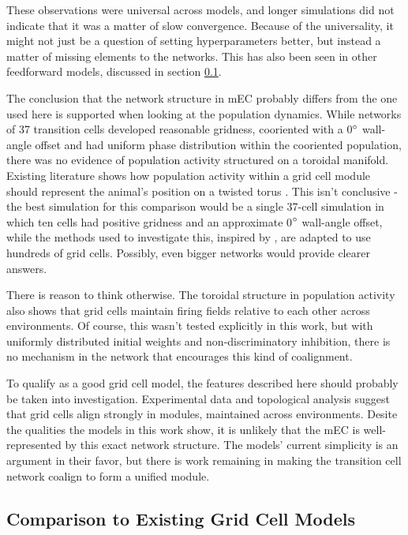 \documentclass{article}
\begin{document}
    These observations were universal across models, and longer simulations did not indicate that it was a matter of slow convergence. Because of the universality, it might not just be a question of setting hyperparameters better, but instead a matter of missing elements to the networks. This has also been seen in other feedforward models, discussed in section \ref{Other model comparisons}.

    The conclusion that the network structure in mEC probably differs from the one used here is supported when looking at the population dynamics. While networks of 37 transition cells developed reasonable gridness, cooriented with a 0\(\degree\) wall-angle offset and had uniform phase distribution within the cooriented population, there was no evidence of population activity structured on a toroidal manifold. Existing literature shows how population activity within a grid cell module should represent the animal's position on a twisted torus \parencite{Gardner2022}. This isn't conclusive - the best simulation for this comparison would be a single 37-cell simulation in which ten cells had positive gridness and an approximate 0\(\degree\) wall-angle offset, while the methods used to investigate this, inspired by \cite{Gardner2022}, are adapted to use hundreds of grid cells. Possibly, even bigger networks would provide clearer answers.

    There is reason to think otherwise. The toroidal structure in population activity also shows that grid cells maintain firing fields relative to each other across environments. Of course, this wasn't tested explicitly in this work, but with uniformly distributed initial weights and non-discriminatory inhibition, there is no mechanism in the network that encourages this kind of coalignment.

    To qualify as a good grid cell model, the features described here should probably be taken into investigation. Experimental data and topological analysis suggest that grid cells align strongly in modules, maintained across environments. Desite the qualities the models in this work show, it is unlikely that the mEC is well-represented by this exact network structure. The models' current simplicity is an argument in their favor, but there is work remaining in making the transition cell network coalign to form a unified module.

    \subsection{Comparison to Existing Grid Cell Models} \label{Other model comparisons}
\end{document}
